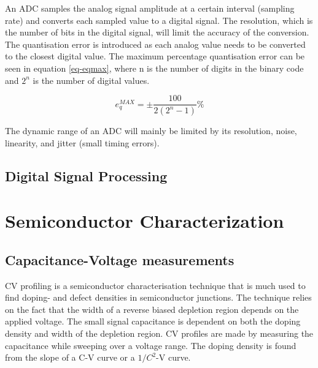 \documentclass[../main/thesis.tex]{subfiles}
\begin{document}
An \gls{ADC} samples the analog signal amplitude at a certain interval (sampling rate) and converts each sampled value to a digital signal. The resolution, which is the number of bits in the digital signal, will limit the accuracy of the conversion. The quantisation error is introduced as each analog value needs to be converted to the closest digital value. The maximum percentage quantisation error can be seen in equation \ref{eq-eqmax}, where n is the number of digits in the binary code and $2^n$ is the number of digital values. \citep[chap. 10]{Bentley}

\begin{equation}%
	e_q^{MAX} = \pm \frac{100}{2(2^n - 1)}\%
	\label{eq-eqmax}
\end{equation}

The dynamic range of an \gls{ADC} will mainly be limited by its resolution, noise, linearity, and jitter (small timing errors). %

\subsection{Digital Signal Processing}
\label{t-dsp}


\section{Semiconductor Characterization}
\label{t-char}

\subsection{Capacitance-Voltage measurements}
\label{t-cv}
\gls{CV} profiling is a semiconductor characterisation technique that is much used to find doping- and defect densities in semiconductor junctions. The technique relies on the fact that the width of a reverse biased depletion region depends on the applied voltage. The small signal capacitance is dependent on both the doping density and width of the depletion region. \gls{CV} profiles are made by measuring the capacitance while sweeping over a voltage range. The doping density is found from the slope of a C-V curve or a $1/C^2$-V curve. \citep[chap. 2]{Schroder}
\end{document}
